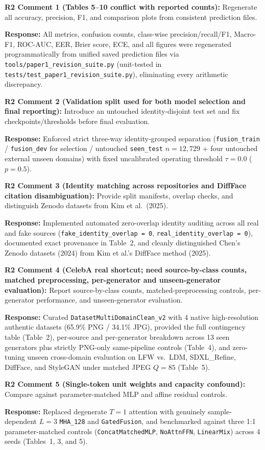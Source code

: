 \documentclass[11pt,a4paper]{article}
\newcommand{\reviewercomment}[2]{%
  \vspace{0.6em}\noindent\begin{tcolorbox}[colback=boxbg,colframe=revcolor,boxrule=0.6pt,left=6pt,right=6pt,top=4pt,bottom=4pt]
  \textbf{\color{revcolor}#1:} #2
  \end{tcolorbox}
}
\newcommand{\authorresponse}[1]{%
  \noindent\textbf{\color{respcolor}Response:} #1\par\vspace{0.5em}
}
\begin{document}
\reviewercomment{R2 Comment 1 (Tables 5--10 conflict with reported counts)}{Regenerate all accuracy, precision, F1, and comparison plots from consistent prediction files.}
\authorresponse{All metrics, confusion counts, class-wise precision/recall/F1, Macro-F1, ROC-AUC, EER, Brier score, ECE, and all figures were regenerated programmatically from unified saved prediction files via \texttt{tools/paper1\_revision\_suite.py} (unit-tested in \texttt{tests/test\_paper1\_revision\_suite.py}), eliminating every arithmetic discrepancy.}

\reviewercomment{R2 Comment 2 (Validation split used for both model selection and final reporting)}{Introduce an untouched identity-disjoint test set and fix checkpoints/thresholds before final evaluation.}
\authorresponse{Enforced strict three-way identity-grouped separation (\texttt{fusion\_train} / \texttt{fusion\_dev} for selection / untouched \texttt{seen\_test} $n=12,729$ + four untouched external unseen domains) with fixed uncalibrated operating threshold $\tau=0.0$ ($p=0.5$).}

\reviewercomment{R2 Comment 3 (Identity matching across repositories and DiffFace citation disambiguation)}{Provide split manifests, overlap checks, and distinguish Zenodo datasets from Kim et al.\ (2025).}
\authorresponse{Implemented automated zero-overlap identity auditing across all real and fake sources (\texttt{fake\_identity\_overlap = 0}, \texttt{real\_identity\_overlap = 0}), documented exact provenance in Table~2, and cleanly distinguished Chen's Zenodo datasets (2024) from Kim et al.'s DiffFace method (2025).}

\reviewercomment{R2 Comment 4 (CelebA real shortcut; need source-by-class counts, matched preprocessing, per-generator and unseen-generator evaluation)}{Report source-by-class counts, matched-preprocessing controls, per-generator performance, and unseen-generator evaluation.}
\authorresponse{Curated \texttt{DatasetMultiDomainClean\_v2} with 4 native high-resolution authentic datasets (65.9\% PNG / 34.1\% JPG), provided the full contingency table (Table~2), per-source and per-generator breakdown across 13 seen generators plus strictly PNG-only same-pipeline controls (Table~4), and zero-tuning unseen cross-domain evaluation on LFW vs.\ LDM, SDXL\_Refine, DiffFace, and StyleGAN under matched JPEG $Q=85$ (Table~5).}

\reviewercomment{R2 Comment 5 (Single-token unit weights and capacity confound)}{Compare against parameter-matched MLP and affine residual controls.}
\authorresponse{Replaced degenerate $T=1$ attention with genuinely sample-dependent $L=3$ \texttt{MHA\_128} and \texttt{GatedFusion}, and benchmarked against three 1:1 parameter-matched controls (\texttt{ConcatMatchedMLP}, \texttt{NoAttnFFN}, \texttt{LinearMix}) across 4 seeds (Tables~1, 3, and 5).}
\end{document}
